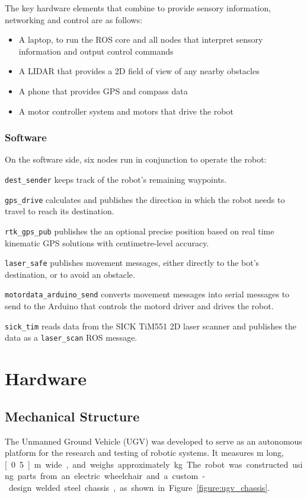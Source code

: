 \documentclass[titlepage,12pt,a4paper]{article}
\begin{document}
The key hardware elements that combine to provide sensory information, networking and control are as follows:

\begin{itemize}
	\item A laptop, to run the ROS core and all nodes that interpret sensory information and output control commands
	\item A LIDAR that provides a 2D field of view of any nearby obstacles
	\item A phone that provides GPS and compass data
	\item A motor controller system and motors that drive the robot
\end{itemize}



\subsubsection{Software}

On the software side, six nodes run in conjunction to operate the robot:

\verb|dest_sender| keeps track of the robot's remaining waypoints.

\verb|gps_drive| calculates and publishes the direction in which the robot needs to travel to reach its destination.

\verb|rtk_gps_pub| publishes the an optional precise position based on real time kinematic GPS solutions with centimetre-level accuracy.

\verb|laser_safe| publishes movement messages, either directly to the bot's destination, or to avoid an obstacle.

\verb|motordata_arduino_send| converts movement messages into serial messages to send to the Arduino that controls the motord driver and drives the robot.

\verb|sick_tim| reads data from the SICK TiM551 2D laser scanner and publishes the data as a \verb|laser_scan| ROS message.

\pagebreak
\section{Hardware}

\subsection{Mechanical Structure}
The Unmanned Ground Vehicle (UGV) was developed to serve as an autonomous platform for the research and testing of robotic systems. It measures \unit[1]{m} long, \unit[0.5]{m} wide, and weighs approximately \unit[50]{kg}. The robot was constructed using parts from an electric wheelchair and a custom-design welded steel chassis, as shown in Figure \ref{figure:ugv_chassis}.
\end{document}
